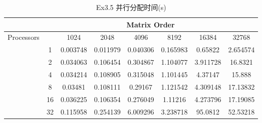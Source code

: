 \documentclass[UTF8]{article}
\begin{document}
\begin{table}[h]
    \caption{Ex3.5 并行分配时间(s)}
    \label{tab:my-table}
    \centering
    \scalebox{0.8} {
    \begin{tabular}{|c|c|c|c|c|c|c|c|}
    \hline
                                & \multicolumn{7}{c|}{Matrix Order}                                    \\ \hline
    \multirow{7}{*}{Processors} &    & 1024     & 2048     & 4096     & 8192     & 16384    & 32768    \\ \cline{2-8} 
                                & 1  & 0.003748 & 0.011979 & 0.040306 & 0.165983 & 0.65822  & 2.654574 \\ \cline{2-8} 
                                & 2  & 0.034063 & 0.106454 & 0.304867 & 1.104077 & 3.911728 & 16.8321  \\ \cline{2-8} 
                                & 4  & 0.034214 & 0.108905 & 0.315048 & 1.101445 & 4.37147  & 15.888   \\ \cline{2-8} 
                                & 8  & 0.03481  & 0.108111 & 0.29167  & 1.121542 & 4.309148 & 17.13832 \\ \cline{2-8} 
                                & 16 & 0.036225 & 0.106354 & 0.276049 & 1.11216  & 4.273796 & 17.19085 \\ \cline{2-8} 
                                & 32 & 0.115958 & 0.254139 & 6.009296 & 3.238718 & 95.0812  & 52.53218 \\ \hline
    \end{tabular}}
    \end{table}
\end{document}
